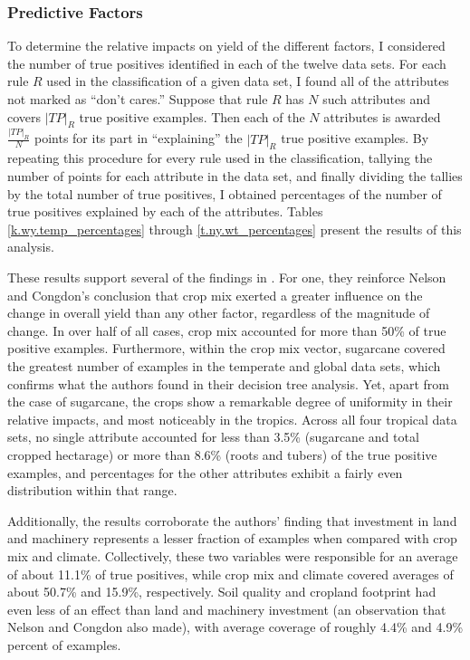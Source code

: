 \documentclass[11pt]{article}
\begin{document}
\subsubsection{Predictive Factors}

To determine the relative impacts on yield of the different factors, I considered the number of true positives identified in each of the twelve data sets. For each rule $R$ used in the classification of a given data set, I found all of the attributes not marked as ``don't cares.'' Suppose that rule $R$ has $N$ such attributes and covers $|TP|_R$ true positive examples. Then each of the $N$ attributes is awarded $\frac{|TP|_R}{N}$ points for its part in ``explaining'' the $|TP|_R$ true positive examples. By repeating this procedure for every rule used in the classification, tallying the number of points for each attribute in the data set, and finally dividing the tallies by the total number of true positives, I obtained percentages of the number of true positives explained by each of the attributes. Tables \ref{k.wy.temp_percentages} through \ref{t.ny.wt_percentages} present the results of this analysis. 

These results support several of the findings in \cite{nelson_measuring_2016}. For one, they reinforce Nelson and Congdon's conclusion that crop mix exerted a greater influence on the change in overall yield than any other factor, regardless of the magnitude of change. In over half of all cases, crop mix accounted for more than 50\% of true positive examples. Furthermore, within the crop mix vector, sugarcane covered the greatest number of examples in the temperate and global data sets, which confirms what the authors found in their decision tree analysis.
Yet, apart from the case of sugarcane, the crops show a remarkable degree of uniformity in their relative impacts, and most noticeably in the tropics. Across all four tropical data sets, no single attribute accounted for less than 3.5\% (sugarcane and total cropped hectarage) or more than 8.6\% (roots and tubers) of the true positive examples, and percentages for the other attributes exhibit a fairly even distribution within that range. 

Additionally, the results corroborate the authors' finding that investment in land and machinery represents a lesser fraction of examples when compared with crop mix and climate. Collectively, these two variables were responsible for an average of about 11.1\% of true positives, while crop mix and climate covered averages of about 50.7\% and 15.9\%, respectively. Soil quality and cropland footprint had even less of an effect than land and machinery investment (an observation that Nelson and Congdon also made), with average coverage of roughly 4.4\% and 4.9\% percent of examples.
\end{document}
